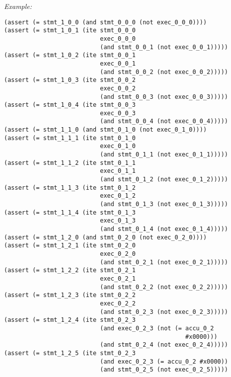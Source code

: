\noindent
\emph{Example:} 

\newpage

\begin{lstlisting}[style=smtlib]
(assert (= stmt_1_0_0 (and stmt_0_0_0 (not exec_0_0_0))))
(assert (= stmt_1_0_1 (ite stmt_0_0_0
                           exec_0_0_0
                           (and stmt_0_0_1 (not exec_0_0_1)))))
(assert (= stmt_1_0_2 (ite stmt_0_0_1
                           exec_0_0_1
                           (and stmt_0_0_2 (not exec_0_0_2)))))
(assert (= stmt_1_0_3 (ite stmt_0_0_2
                           exec_0_0_2
                           (and stmt_0_0_3 (not exec_0_0_3)))))
(assert (= stmt_1_0_4 (ite stmt_0_0_3
                           exec_0_0_3
                           (and stmt_0_0_4 (not exec_0_0_4)))))
(assert (= stmt_1_1_0 (and stmt_0_1_0 (not exec_0_1_0))))
(assert (= stmt_1_1_1 (ite stmt_0_1_0
                           exec_0_1_0
                           (and stmt_0_1_1 (not exec_0_1_1)))))
(assert (= stmt_1_1_2 (ite stmt_0_1_1
                           exec_0_1_1
                           (and stmt_0_1_2 (not exec_0_1_2)))))
(assert (= stmt_1_1_3 (ite stmt_0_1_2
                           exec_0_1_2
                           (and stmt_0_1_3 (not exec_0_1_3)))))
(assert (= stmt_1_1_4 (ite stmt_0_1_3
                           exec_0_1_3
                           (and stmt_0_1_4 (not exec_0_1_4)))))
(assert (= stmt_1_2_0 (and stmt_0_2_0 (not exec_0_2_0))))
(assert (= stmt_1_2_1 (ite stmt_0_2_0
                           exec_0_2_0
                           (and stmt_0_2_1 (not exec_0_2_1)))))
(assert (= stmt_1_2_2 (ite stmt_0_2_1
                           exec_0_2_1
                           (and stmt_0_2_2 (not exec_0_2_2)))))
(assert (= stmt_1_2_3 (ite stmt_0_2_2
                           exec_0_2_2
                           (and stmt_0_2_3 (not exec_0_2_3)))))
(assert (= stmt_1_2_4 (ite stmt_0_2_3
                           (and exec_0_2_3 (not (= accu_0_2
                                                   #x0000)))
                           (and stmt_0_2_4 (not exec_0_2_4)))))
(assert (= stmt_1_2_5 (ite stmt_0_2_3
                           (and exec_0_2_3 (= accu_0_2 #x0000))
                           (and stmt_0_2_5 (not exec_0_2_5)))))
\end{lstlisting}

